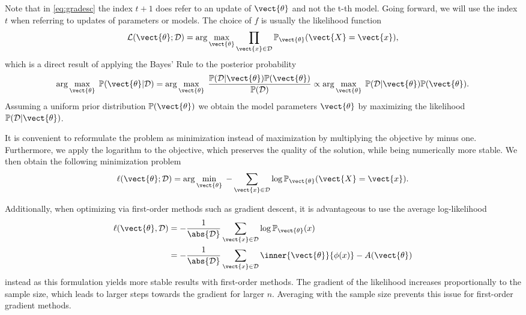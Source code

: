     Note that in \autoref{eq:gradesc} the index $t+1$ does refer to an update of $\vect{\theta}$ and not the t-th model.
    Going forward, we will use the index $t$ when referring to updates of parameters or models. 
    The choice of $f$ is usually the likelihood function
    \begin{equation}
        \label{eq:likelihood}
        \mathcal{L}(\vect{\theta} ; \mathcal{D}) = \arg\max_{\vect{\theta}}\prod_{\vect{x} \in \mathcal{D}}  \mathbb{P}_{\vect{\theta}}(\vect{X} = \vect{x}),
    \end{equation}
    which is a direct result of applying the Bayes' Rule to the posterior probability
    \begin{equation}
        \arg\max_{\vect{\theta}} \; \mathbb{P}(\vect{\theta} \lvert \mathcal{D}) = \arg\max_{\vect{\theta}} \; \frac{\mathbb{P}(\mathcal{D} \lvert \vect{\theta}) \mathbb{P}(\vect{\theta})}{\mathbb{P}(\mathcal{D})} \propto   \arg\max_{\vect{\theta}} \; \mathbb{P}(\mathcal{D} \lvert \vect{\theta}) \mathbb{P}(\vect{\theta}).
    \end{equation}
    Assuming a uniform prior distribution $\mathbb{P}(\vect{\theta})$ we obtain the model parameters $\vect{\theta}$ by maximizing the likelihood $\mathbb{P}(\mathcal{D} \lvert \vect{\theta})$.

    It is convenient to reformulate the problem as minimization instead of maximization by multiplying the objective by minus one. 
    Furthermore, we apply the logarithm to the objective, which preserves the quality of the solution, while being numerically more stable.
    We then obtain the following minimization problem
    \begin{equation}
        \label{eq:likelihood:log}
        \ell(\vect{\theta} ; \mathcal{D}) = \arg\min_{\vect{\theta}} \; - \sum_{\vect{x} \in \mathcal{D}}  \log \mathbb{P}_{\vect{\theta}}(\vect{X} = \vect{x}).
    \end{equation}

    Additionally, when optimizing via first-order methods such as gradient descent, it is advantageous to use the average log-likelihood
    \begin{equation}
        \label{eq:likelihood:expfam}
        \begin{split}
        \ell(\vect{\theta}, \mathcal{D}) &= - \frac{1}{\abs{\mathcal{D}}} \sum_{\vect{x} \in \mathcal{D}} \log \mathbb{P}_{\vect{\theta}}(x)\\
        &= - \frac{1}{\abs{\mathcal{D}}} \sum_{\vect{x} \in \mathcal{D}} \inner{\vect{\theta}}{\phi(x)} - A(\vect{\theta})
    \end{split}
    \end{equation}
    instead as this formulation yields more stable results with first-order methods.
The gradient of the likelihood increases proportionally to the sample size, which leads to larger steps towards the gradient for larger $n$.
Averaging with the sample size prevents this issue for first-order gradient methods.

